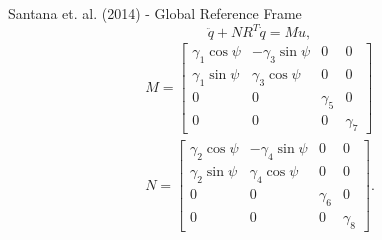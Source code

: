 \begin{frame}
	\begin{block}{Santana et. al. (2014) - Global Reference Frame}
			\begin{equation} \label{eq:robotic_dyn}
			\ddot{q}+NR^{T}\dot{q} = Mu, 
			\end{equation}
			\begin{eqnarray}
			M = \begin{bmatrix}
			\gamma_1\cos{\psi} & -\gamma_3\sin{\psi} & 0 & 0 \\
			\gamma_1\sin{\psi} & \gamma_3\cos{\psi} & 0 & 0 \\
			0 & 0 & \gamma_5 & 0 \\
			0 & 0 & 0 & \gamma_7
			\end{bmatrix} \\
			N =     \begin{bmatrix}
			\gamma_2\cos{\psi} & -\gamma_4\sin{\psi} & 0 & 0 \\
			\gamma_2\sin{\psi} & \gamma_4\cos{\psi} & 0 & 0 \\
			0 & 0 & \gamma_6 & 0 \\
			0 & 0 & 0 & \gamma_8
			\end{bmatrix}.
			\end{eqnarray}
	\end{block}	
\end{frame}

